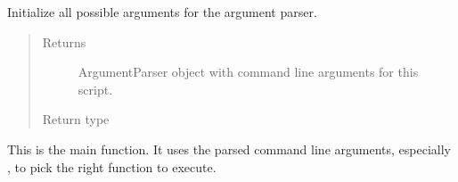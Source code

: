 \documentclass[letterpaper,10pt,english]{sphinxmanual}
\begin{document}

\begin{fulllineitems}
\label{src.eval:src.eval.eval_vectors.init_argparser}
Initialize all possible arguments for the argument parser.
\begin{quote}\begin{description}
\item[{Returns}] \leavevmode
ArgumentParser object with command line arguments for this script.

\item[{Return type}] \leavevmode
{}

\end{description}\end{quote}

\end{fulllineitems}


\begin{fulllineitems}
\label{src.eval:src.eval.eval_vectors.main}
This is the main function. It uses the parsed command line arguments, especially , to pick the right
function to execute.

\end{fulllineitems}

\end{document}
